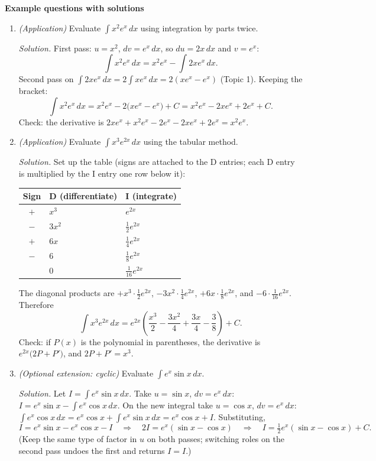 \documentclass[11pt]{article}
\begin{document}
\textbf{Example questions with solutions}
\begin{enumerate}
\item \emph{(Application)} Evaluate $\displaystyle\int x^2e^x\,dx$ using integration by parts twice.

\textit{Solution.} First pass: $u=x^2$, $dv=e^x\,dx$, so $du=2x\,dx$ and $v=e^x$:
\[ \int x^2e^x\,dx = x^2e^x - \int 2xe^x\,dx. \]
Second pass on $\int 2xe^x\,dx = 2\int xe^x\,dx = 2(xe^x - e^x)$ (Topic 1). Keeping the bracket:
\[ \int x^2e^x\,dx = x^2e^x - 2\big(xe^x - e^x\big) + C = x^2e^x - 2xe^x + 2e^x + C. \]
Check: the derivative is $2xe^x + x^2e^x - 2e^x - 2xe^x + 2e^x = x^2e^x$.

\item \emph{(Application)} Evaluate $\displaystyle\int x^3e^{2x}\,dx$ using the tabular method.

\textit{Solution.} Set up the table (signs are attached to the D entries; each D entry is multiplied by the I entry one row below it):

\smallskip
\begin{tabular}{cll}
\toprule
\textbf{Sign} & \textbf{D (differentiate)} & \textbf{I (integrate)} \\
\midrule
$+$ & $x^3$ & $e^{2x}$ \\
$-$ & $3x^2$ & $\tfrac12 e^{2x}$ \\
$+$ & $6x$ & $\tfrac14 e^{2x}$ \\
$-$ & $6$ & $\tfrac18 e^{2x}$ \\
 & $0$ & $\tfrac1{16} e^{2x}$ \\
\bottomrule
\end{tabular}

\smallskip
The diagonal products are $+x^3\cdot\tfrac12e^{2x}$, $-3x^2\cdot\tfrac14e^{2x}$, $+6x\cdot\tfrac18e^{2x}$, and $-6\cdot\tfrac1{16}e^{2x}$. Therefore
\[ \int x^3e^{2x}\,dx = e^{2x}\left(\frac{x^3}{2} - \frac{3x^2}{4} + \frac{3x}{4} - \frac38\right) + C. \]
Check: if $P(x)$ is the polynomial in parentheses, the derivative is $e^{2x}\big(2P+P'\big)$, and $2P + P' = x^3$.

\item \emph{(Optional extension: cyclic)} Evaluate $\displaystyle\int e^x\sin x\,dx$.

\textit{Solution.} Let $I=\int e^x\sin x\,dx$. Take $u=\sin x$, $dv=e^x\,dx$: $I = e^x\sin x - \int e^x\cos x\,dx$. On the new integral take $u=\cos x$, $dv=e^x\,dx$: $\int e^x\cos x\,dx = e^x\cos x + \int e^x\sin x\,dx = e^x\cos x + I$. Substituting,
\[ I = e^x\sin x - e^x\cos x - I \quad\Longrightarrow\quad 2I = e^x(\sin x - \cos x) \quad\Longrightarrow\quad I = \tfrac12e^x(\sin x - \cos x) + C. \]
(Keep the same type of factor in $u$ on both passes; switching roles on the second pass undoes the first and returns $I=I$.)
\end{enumerate}
\end{document}
